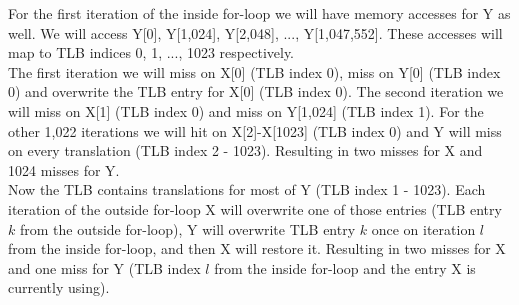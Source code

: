 \documentclass[a4paper, 11pt]{exam}
\begin{document}
\begin{enumerate}
For the first iteration of the inside for-loop we will have memory accesses for Y as well. We will access Y[0], Y[1,024], Y[2,048], ..., Y[1,047,552]. These accesses will map to TLB indices 0, 1, ..., 1023 respectively.\\

The first iteration we will miss on X[0] (TLB index 0), miss on Y[0] (TLB index 0) and overwrite the TLB entry for X[0] (TLB index 0). The second iteration we will miss on X[1] (TLB index 0) and miss on Y[1,024] (TLB index 1). For the other 1,022 iterations we will hit on X[2]-X[1023] (TLB index 0) and Y will miss on every translation (TLB index 2 - 1023). Resulting in two misses for X and 1024 misses for Y. \\

Now the TLB contains translations for most of Y (TLB index 1 - 1023). Each iteration of the outside for-loop X will overwrite one of those entries (TLB entry $k$ from the outside for-loop), Y will overwrite TLB entry $k$ once on iteration $l$ from the inside for-loop, and then X will restore it. Resulting in two misses for X and one miss for Y (TLB index $l$ from the inside for-loop and the entry X is currently using). \\


\end{enumerate}
\end{document}
